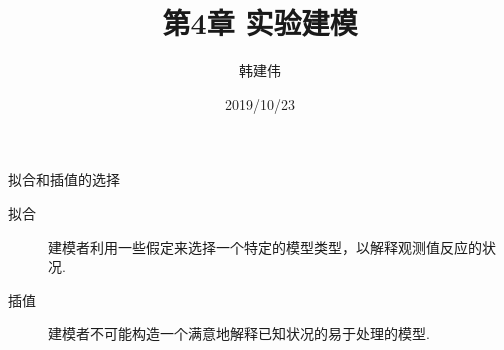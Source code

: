 \documentclass[UTF8]{ctexbeamer}
\title{第4章 实验建模}
\author{韩建伟}
\institute{
  信息学院\\
  \texttt{hanjianwei@zjgsu.du.cn}
}
\date{2019/10/23}
\begin{document}
\begin{frame}[plain]
  \titlepage{}
\end{frame}

\begin{frame}{拟合和插值的选择}

  \begin{description}
  \item[拟合] 建模者利用一些假定来选择一个特定的模型类型，以解释观测值反应的状况.
  \item[插值] 建模者不可能构造一个满意地解释已知状况的易于处理的模型.
  \end{description}

  \begin{figure}
    \centering
  \end{figure}


\end{frame}
\end{document}
